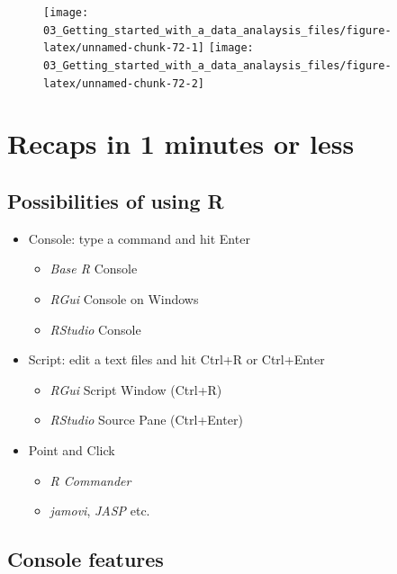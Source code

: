 \documentclass[
]{book}
\providecommand{\tightlist}{%
  \setlength{\itemsep}{0pt}\setlength{\parskip}{0pt}}
\begin{document}
\begin{figure}
\texttt{[image: 03\_Getting\_started\_with\_a\_data\_analaysis\_files/figure-latex/unnamed-chunk-72-1]} \texttt{[image: 03\_Getting\_started\_with\_a\_data\_analaysis\_files/figure-latex/unnamed-chunk-72-2]} \end{figure}

\hypertarget{appendix-appendix}{%
\appendix}


\hypertarget{recaps-in-1-minutes-or-less}{%
\chapter{Recaps in 1 minutes or less}\label{recaps-in-1-minutes-or-less}}

\hypertarget{possibilities-of-using-r}{%
\section{Possibilities of using R}\label{possibilities-of-using-r}}

\begin{itemize}
\item
  Console: type a command and hit Enter

  \begin{itemize}
  \tightlist
  \item
    \emph{Base R} Console
  \item
    \emph{RGui} Console on Windows
  \item
    \emph{RStudio} Console
  \end{itemize}
\item
  Script: edit a text files and hit Ctrl+R or Ctrl+Enter

  \begin{itemize}
  \tightlist
  \item
    \emph{RGui} Script Window (Ctrl+R)
  \item
    \emph{RStudio} Source Pane (Ctrl+Enter)
  \end{itemize}
\item
  Point and Click

  \begin{itemize}
  \tightlist
  \item
    \emph{R Commander}
  \item
    \emph{jamovi}, \emph{JASP} etc.
  \end{itemize}
\end{itemize}

\hypertarget{console-features-1}{%
\section{Console features}\label{console-features-1}}
\end{document}
